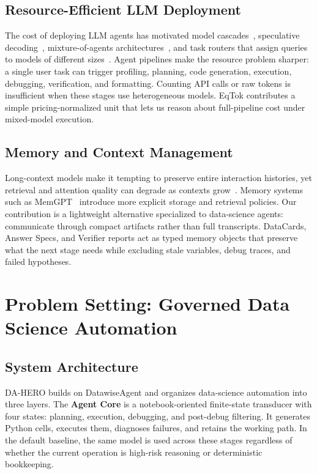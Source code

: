 \documentclass[letterpaper]{article} %
\begin{document}
\subsection{Resource-Efficient LLM Deployment}

The cost of deploying LLM agents has motivated model cascades~\cite{varshney2022model}, speculative decoding~\cite{leviathan2023fast}, mixture-of-agents architectures~\cite{wang2024mixture}, and task routers that assign queries to models of different sizes~\cite{chen2024fusellm, ong2024route}.  Agent pipelines make the resource problem sharper: a single user task can trigger profiling, planning, code generation, execution, debugging, verification, and formatting.  Counting API calls or raw tokens is insufficient when these stages use heterogeneous models.  EqTok contributes a simple pricing-normalized unit that lets us reason about full-pipeline cost under mixed-model execution.

\subsection{Memory and Context Management}

Long-context models make it tempting to preserve entire interaction histories, yet retrieval and attention quality can degrade as contexts grow~\cite{liu2024lost}.  Memory systems such as MemGPT~\cite{packer2023memgpt} introduce more explicit storage and retrieval policies.  Our contribution is a lightweight alternative specialized to data-science agents: communicate through compact artifacts rather than full transcripts.  DataCards, Answer Specs, and Verifier reports act as typed memory objects that preserve what the next stage needs while excluding stale variables, debug traces, and failed hypotheses.

\section{Problem Setting: Governed Data Science Automation}
\label{sec:background}

\subsection{System Architecture}

DA-HERO builds on DatawiseAgent and organizes data-science automation into three layers.  The \textbf{Agent Core} is a notebook-oriented finite-state transducer with four states: planning, execution, debugging, and post-debug filtering.  It generates Python cells, executes them, diagnoses failures, and retains the working path.  In the default baseline, the same model is used across these stages regardless of whether the current operation is high-risk reasoning or deterministic bookkeeping.
\end{document}
